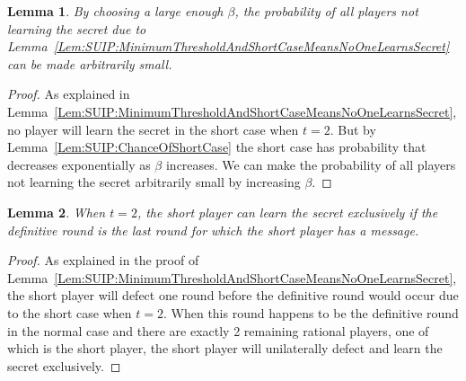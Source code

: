 \documentclass[12pt]{dalcsthesis}
\newtheorem{lemma}{Lemma}
\begin{document}
\begin{lemma}\label{Lem:SUIP:NoPlayerLearningSecretIsReducible}By choosing a large enough $\beta$, the probability of all players not learning the secret due to Lemma~\ref{Lem:SUIP:MinimumThresholdAndShortCaseMeansNoOneLearnsSecret} can be made arbitrarily small.\end{lemma} 
\begin{proof}
As explained in Lemma~\ref{Lem:SUIP:MinimumThresholdAndShortCaseMeansNoOneLearnsSecret}, no player will learn the secret in the short case when $t=2$. But by Lemma~\ref{Lem:SUIP:ChanceOfShortCase} the short case has probability that decreases exponentially as $\beta$ increases. We can make the probability of all players not learning the secret arbitrarily small by increasing $\beta$.
\end{proof}

\begin{lemma}\label{Lem:SUIP:ShortPlayerMayLearnSecretExclusively}When $t=2$, the short player can learn the secret exclusively if the definitive round is the last round for which the short player has a message.\end{lemma} 
\begin{proof}
As explained in the proof of Lemma~\ref{Lem:SUIP:MinimumThresholdAndShortCaseMeansNoOneLearnsSecret}, the short player will defect one round before the definitive round would occur due to the short case when $t=2$. When this round happens to be the definitive round in the normal case and there are exactly 2 remaining rational players, one of which is the short player, the short player will unilaterally defect and learn the secret exclusively.
\end{proof}
\end{document}
